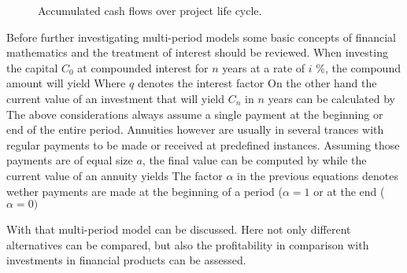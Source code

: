         \begin{figure}
            \center
            
            \caption{Accumulated cash flows over project life cycle.\cite{Marquardt.2008}}
            \label{fig:CashFlow}
        \end{figure}

        Before further investigating multi-period models some basic concepts of financial mathematics
        and the treatment of interest should be reviewed. When investing the capital $C_0$ at compounded
        interest for $n$ years at a rate of $i$ \%, the compound amount will yield
        Where $q$ denotes the interest factor
        On the other hand the current value of an investment that will yield $C_n$ in $n$ years can be calculated
        by
        The above considerations always assume a single payment at the beginning or end of the entire period.
        Annuities however are usually in several trances with regular payments to be made or received at
        predefined instances. Assuming those payments are of equal size $a$, the final value can be computed by
        while the current value of an annuity yields
        The factor $\alpha$ in the previous equations denotes wether payments are made at the beginning
        of a period ($\alpha = 1$ or at the end ($\alpha = 0)$

        With that multi-period model can be discussed. Here not only different alternatives can be compared,
        but also the profitability in comparison with investments in financial products can be assessed.

